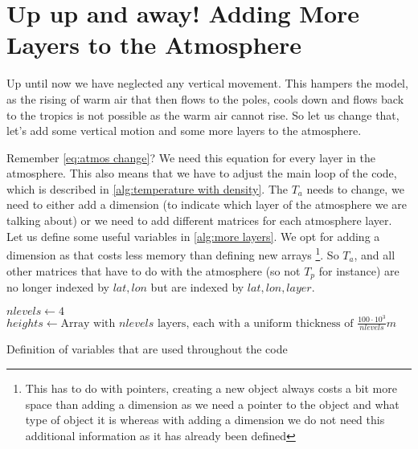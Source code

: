 \section{Up up and away! Adding More Layers to the Atmosphere}
Up until now we have neglected any vertical movement. This hampers the model, as the rising of warm air that then flows to the poles, cools down and flows back to the tropics is not possible
as the warm air cannot rise. So let us change that, let's add some vertical motion and some more layers to the atmosphere.

Remember \autoref{eq:atmos change}? We need this equation for every layer in the atmosphere. This also means that we have to adjust the main loop of the code, which is described  in 
\autoref{alg:temperature with density}. The $T_a$ needs to change, we need to either add a dimension (to indicate which layer of the atmosphere we are talking about) or we need to add different
matrices for each atmosphere layer. Let us define some useful variables in \autoref{alg:more layers}. We opt for adding a dimension as that costs less memory than defining new arrays 
\footnote{This has to do with pointers, creating a new object always costs a bit more space than adding a dimension as we need a pointer to the object and what type of object it is whereas with 
adding a dimension we do not need this additional information as it has already been defined}. So $T_a$, and all other matrices that have to do with the atmosphere (so not $T_p$ for instance) 
are no longer indexed by $lat, lon$ but are indexed by $lat, lon, layer$.

\begin{algorithm}
    $nlevels \leftarrow 4$ \;
    $heights \leftarrow \text{Array with } nlevels \text{ layers, each with a uniform thickness of } \frac{100 \cdot 10^3}{nlevels} m$ \;
    \caption{Definition of variables that are used throughout the code}
    \label{alg:more layers}
\end{algorithm}

